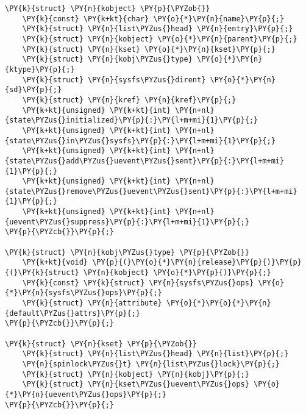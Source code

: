 \begin{Verbatim}[commandchars=\\\{\}]
\PY{k}{struct} \PY{n}{kobject} \PY{p}{\PYZob{}}
	\PY{k}{const} \PY{k+kt}{char} \PY{o}{*}\PY{n}{name}\PY{p}{;}
	\PY{k}{struct} \PY{n}{list\PYZus{}head} \PY{n}{entry}\PY{p}{;}
	\PY{k}{struct} \PY{n}{kobject} \PY{o}{*}\PY{n}{parent}\PY{p}{;}
	\PY{k}{struct} \PY{n}{kset} \PY{o}{*}\PY{n}{kset}\PY{p}{;}
	\PY{k}{struct} \PY{n}{kobj\PYZus{}type} \PY{o}{*}\PY{n}{ktype}\PY{p}{;}
	\PY{k}{struct} \PY{n}{sysfs\PYZus{}dirent} \PY{o}{*}\PY{n}{sd}\PY{p}{;}
	\PY{k}{struct} \PY{n}{kref} \PY{n}{kref}\PY{p}{;}
	\PY{k+kt}{unsigned} \PY{k+kt}{int} \PY{n+nl}{state\PYZus{}initialized}\PY{p}{:}\PY{l+m+mi}{1}\PY{p}{;}
	\PY{k+kt}{unsigned} \PY{k+kt}{int} \PY{n+nl}{state\PYZus{}in\PYZus{}sysfs}\PY{p}{:}\PY{l+m+mi}{1}\PY{p}{;}
	\PY{k+kt}{unsigned} \PY{k+kt}{int} \PY{n+nl}{state\PYZus{}add\PYZus{}uevent\PYZus{}sent}\PY{p}{:}\PY{l+m+mi}{1}\PY{p}{;}
	\PY{k+kt}{unsigned} \PY{k+kt}{int} \PY{n+nl}{state\PYZus{}remove\PYZus{}uevent\PYZus{}sent}\PY{p}{:}\PY{l+m+mi}{1}\PY{p}{;}
	\PY{k+kt}{unsigned} \PY{k+kt}{int} \PY{n+nl}{uevent\PYZus{}suppress}\PY{p}{:}\PY{l+m+mi}{1}\PY{p}{;}
\PY{p}{\PYZcb{}}\PY{p}{;}

\PY{k}{struct} \PY{n}{kobj\PYZus{}type} \PY{p}{\PYZob{}}
	\PY{k+kt}{void} \PY{p}{(}\PY{o}{*}\PY{n}{release}\PY{p}{)}\PY{p}{(}\PY{k}{struct} \PY{n}{kobject} \PY{o}{*}\PY{p}{)}\PY{p}{;}
	\PY{k}{const} \PY{k}{struct} \PY{n}{sysfs\PYZus{}ops} \PY{o}{*}\PY{n}{sysfs\PYZus{}ops}\PY{p}{;}
	\PY{k}{struct} \PY{n}{attribute} \PY{o}{*}\PY{o}{*}\PY{n}{default\PYZus{}attrs}\PY{p}{;}
\PY{p}{\PYZcb{}}\PY{p}{;}

\PY{k}{struct} \PY{n}{kset} \PY{p}{\PYZob{}}
	\PY{k}{struct} \PY{n}{list\PYZus{}head} \PY{n}{list}\PY{p}{;}
	\PY{n}{spinlock\PYZus{}t} \PY{n}{list\PYZus{}lock}\PY{p}{;}
	\PY{k}{struct} \PY{n}{kobject} \PY{n}{kobj}\PY{p}{;}
	\PY{k}{struct} \PY{n}{kset\PYZus{}uevent\PYZus{}ops} \PY{o}{*}\PY{n}{uevent\PYZus{}ops}\PY{p}{;}
\PY{p}{\PYZcb{}}\PY{p}{;}
\end{Verbatim}
